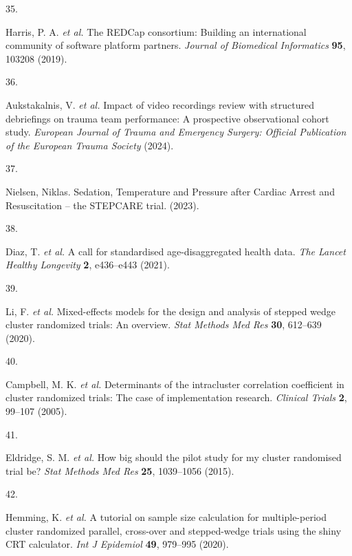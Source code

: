 \documentclass[
]{scrartcl}
\newlength{\cslhangindent}
\newlength{\csllabelwidth}
\newlength{\cslentryspacingunit} %
\newenvironment{CSLReferences}[2] %
 {%
  \setlength{\parindent}{0pt}
  \ifodd #1
  \let\oldpar\par
  \def\par{\hangindent=\cslhangindent\oldpar}
  \fi
  \setlength{\parskip}{#2\cslentryspacingunit}
 }%
 {}
\newcommand{\CSLLeftMargin}[1]{\parbox[t]{\csllabelwidth}{#1}}
\newcommand{\CSLRightInline}[1]{\parbox[t]{\linewidth - \csllabelwidth}{#1}\break}
\begin{document}
\begin{CSLReferences}{0}{0}
\leavevmode{}%
\CSLLeftMargin{35. }%
\CSLRightInline{Harris, P. A. \emph{et al.} The {REDCap} consortium:
{Building} an international community of software platform partners.
\emph{Journal of Biomedical Informatics} \textbf{95}, 103208 (2019).}

\leavevmode{}%
\CSLLeftMargin{36. }%
\CSLRightInline{Aukstakalnis, V. \emph{et al.} Impact of video
recordings review with structured debriefings on trauma team
performance: A prospective observational cohort study. \emph{European
Journal of Trauma and Emergency Surgery: Official Publication of the
European Trauma Society} (2024).}

\leavevmode{}%
\CSLLeftMargin{37. }%
\CSLRightInline{Nielsen, Niklas. Sedation, {Temperature} and {Pressure}
after {Cardiac} {Arrest} and {Resuscitation} -- the {STEPCARE} trial.
(2023).}

\leavevmode{}%
\CSLLeftMargin{38. }%
\CSLRightInline{Diaz, T. \emph{et al.} A call for standardised
age-disaggregated health data. \emph{The Lancet Healthy Longevity}
\textbf{2}, e436--e443 (2021).}

\leavevmode{}%
\CSLLeftMargin{39. }%
\CSLRightInline{Li, F. \emph{et al.} Mixed-effects models for the design
and analysis of stepped wedge cluster randomized trials: An overview.
\emph{Stat Methods Med Res} \textbf{30}, 612--639 (2020).}

\leavevmode{}%
\CSLLeftMargin{40. }%
\CSLRightInline{Campbell, M. K. \emph{et al.} Determinants of the
intracluster correlation coefficient in cluster randomized trials: The
case of implementation research. \emph{Clinical Trials} \textbf{2},
99--107 (2005).}

\leavevmode{}%
\CSLLeftMargin{41. }%
\CSLRightInline{Eldridge, S. M. \emph{et al.} How big should the pilot
study for my cluster randomised trial be? \emph{Stat Methods Med Res}
\textbf{25}, 1039--1056 (2015).}

\leavevmode{}%
\CSLLeftMargin{42. }%
\CSLRightInline{Hemming, K. \emph{et al.} A tutorial on sample size
calculation for multiple-period cluster randomized parallel, cross-over
and stepped-wedge trials using the shiny CRT calculator. \emph{Int J
Epidemiol} \textbf{49}, 979--995 (2020).}


\end{CSLReferences}
\end{document}
